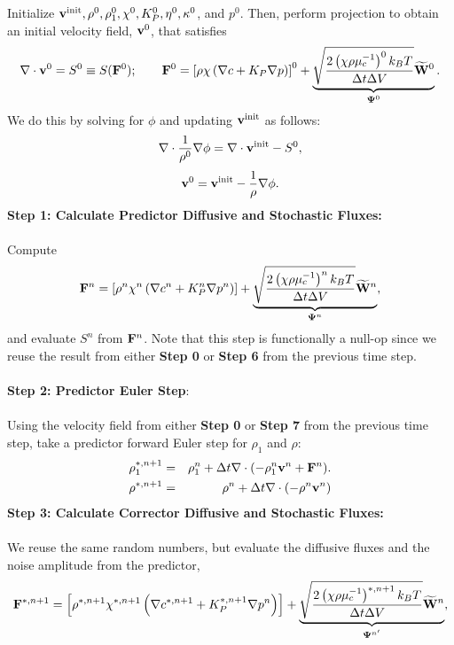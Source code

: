 \documentclass[final]{siamltex}
\def\Fb {{\bf F}}
\def\vb {{\bf v}}
\def\Wb {{\bf W}}
\def\Psib   {\boldsymbol{\Psi}}
\begin{document}
Initialize $\vb^{\rm init}, \rho^0, \rho_1^0, \chi^0, K_P^0, \eta^0, \kappa^0$, and $p^0$.
Then, perform projection to obtain an initial velocity field, $\vb^0$, that satisfies
\begin{equation}
\nabla\cdot\vb^0 = S^0 \equiv S(\Fb^0); \qquad 
\Fb^0 = \left[\rho\chi\left(\nabla c + K_P\nabla p\right)\right]^0 + \underbrace{\sqrt{\frac{2\left(\chi\rho\mu_c^{-1}\right)^0k_B T}{\Delta t\Delta V}}\widetilde\Wb^0}_{\Psib^0}.
\end{equation}
We do this by solving for $\phi$ and updating $\vb^{\rm init}$ as follows:
\begin{equation}
\nabla\cdot\frac{1}{\rho^0}\nabla\phi = \nabla\cdot\vb^{\rm init} - S^0,
\end{equation}
\begin{equation}
\vb^0 = \vb^{\rm init} - \frac{1}{\rho}\nabla\phi.
\end{equation}
{\bf Step 1: Calculate Predictor Diffusive and Stochastic Fluxes:}\\ \\
Compute
\begin{equation}
\Fb^n = \left[\rho^n\chi^n\left(\nabla c^n + K_P^n\nabla p^n\right)\right] + \underbrace{\sqrt{\frac{2\left(\chi\rho\mu_c^{-1}\right)^nk_B T}{\Delta t\Delta V}}\widetilde\Wb^n}_{\Psib^n},
\end{equation}
and evaluate $S^n$ from $\Fb^n$.  Note that this step is functionally a null-op since
we reuse the result from either {\bf Step 0} or {\bf Step 6} from the previous 
time step.\\ \\
{\bf Step 2: Predictor Euler Step}:\\ \\
Using the velocity field from either {\bf Step 0} or {\bf Step 7} from the previous 
time step, take a predictor forward Euler step for $\rho_1$ and $\rho$:
\begin{eqnarray}
\rho_1^{*,n+1} &=& \rho_1^n + \Delta t\nabla\cdot(-\rho_1^n\vb^n + \Fb^n).\label{eq:alg1_1st_rho1_adv}\\
\rho^{*,n+1} &=& \rho^n + \Delta t\nabla\cdot(-\rho^n\vb^n)\label{eq:alg1_1st_rho_adv}
\end{eqnarray}
{\bf Step 3: Calculate Corrector Diffusive and Stochastic Fluxes:}\\ \\
We reuse the same random numbers, but evaluate the diffusive fluxes and the noise
amplitude from the predictor,
\begin{equation}
\Fb^{*,n+1} = \left[\rho^{*,n+1}\chi^{*,n+1}\left(\nabla c^{*,n+1} + K_P^{*,n+1}\nabla p^n\right)\right] + \underbrace{\sqrt{\frac{2\left(\chi\rho\mu_c^{-1}\right)^{*,n+1}k_B T}{\Delta t\Delta V}}\widetilde\Wb^n}_{\Psib^{n'}},
\end{equation}
\end{document}
